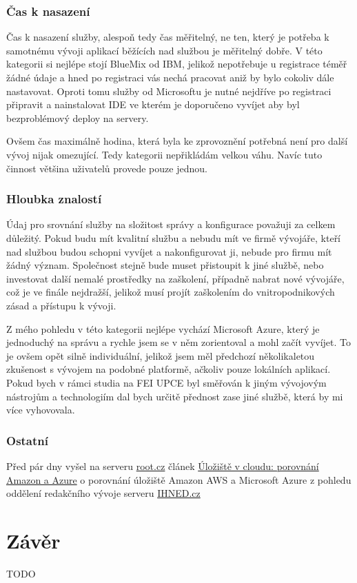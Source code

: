 \subsubsection{Čas k nasazení}
Čas k nasazení služby, alespoň tedy čas měřitelný, ne ten, který je potřeba k samotnému vývoji aplikací běžících nad službou je měřitelný dobře. V této kategorii si nejlépe stojí BlueMix od IBM, jelikož nepotřebuje u registrace téměř žádné údaje a hned po registraci vás nechá pracovat aniž by bylo cokoliv dále nastavovat. Oproti tomu služby od Microsoftu je nutné nejdříve po registraci připravit a nainstalovat IDE ve kterém je doporučeno vyvíjet aby byl bezproblémový deploy na servery.

Ovšem čas maximálně hodina, která byla ke zprovoznění potřebná není pro další vývoj nijak omezující. Tedy kategorii nepřikládám velkou váhu. Navíc tuto činnost většina uživatelů provede pouze jednou.

\subsubsection{Hloubka znalostí}
Údaj pro srovnání služby na složitost správy a konfigurace považuji za celkem důležitý. Pokud budu mít kvalitní službu a nebudu mít ve firmě vývojáře, kteří nad službou budou schopni vyvíjet a nakonfigurovat ji, nebude pro firmu mít žádný význam. Společnost stejně bude muset přistoupit k jiné službě, nebo investovat další nemalé prostředky na zaškolení, případně nabrat nové vývojáře, což je ve finále nejdražší, jelikož musí projít zaškolením do vnitropodnikových zásad a přístupu k vývoji.

Z mého pohledu v této kategorii nejlépe vychází Microsoft Azure, který je jednoduchý na správu a rychle jsem se v něm zorientoval a mohl začít vyvíjet. To je ovšem opět silně individuální, jelikož jsem měl předchozí několikaletou zkušenost s vývojem na podobné platformě, ačkoliv pouze lokálních aplikací. Pokud bych v rámci studia na FEI UPCE byl směřován k jiným vývojovým nástrojům a technologiím dal bych určitě přednost zase jiné službě, která by mi více vyhovovala.

\subsubsection{Ostatní}
Před pár dny vyšel na serveru \href{http://root.cz}{root.cz} článek \href{http://www.root.cz/clanky/uloziste-v-cloudu-porovnani-amazon-a-azure/}{Úložiště v cloudu: porovnání Amazon a Azure\cite{root:porovnaniAzureAWS}} o porovnání úložiště Amazon AWS a Microsoft Azure z pohledu oddělení redakčního vývoje serveru \href{http: //ihned.cz}{IHNED.cz}

\newpage
\section{Závěr}
TODO